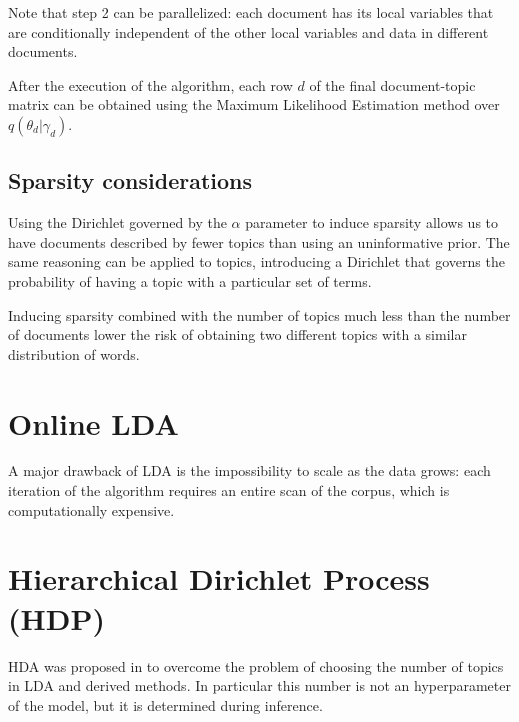 Note that step 2 can be parallelized: each document has its local variables that are conditionally independent
of the other local variables and data in different documents.

After the execution of the algorithm, each row $d$ of the final document-topic matrix can be obtained using the Maximum Likelihood Estimation method over $q(\theta_d | \gamma_d)$.

\subsection{Sparsity considerations}
Using the Dirichlet governed by the $\alpha$ parameter to induce sparsity
allows us to have documents described by fewer topics than using an uninformative prior.
The same reasoning can be applied to topics, introducing a Dirichlet that governs the
probability of having a topic with a particular set of terms.

Inducing sparsity combined with the number of topics much less than the number of documents
lower the risk of obtaining two different topics with a similar distribution of words.


\section{Online LDA}
A major drawback of LDA is the impossibility to scale as the data grows:
each iteration of the algorithm requires an entire scan of the corpus, which is computationally expensive.

\section{Hierarchical Dirichlet Process (HDP)}
HDA was proposed in \cite{DBLP:journals/jmlr/WangPB11} to overcome the problem of choosing the number of topics in LDA and derived methods.
In particular this number is not an hyperparameter of the model, but it is determined during inference.

